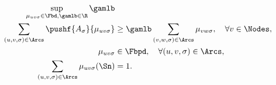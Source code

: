 \begin{myprog}
  \label{prog:dualinf}
  \begin{align}
    \notag
    \sup_{\mu_{uv\sigma} \in \Fbd, \gamlb \in \R} \gamlb\\
    \label{eq:dualinf1}
    \sum_{(u,v,\sigma) \in \Arcs} \pushf{A_{\sigma}}{\mu_{uv\sigma}} & \geq \gamlb \sum_{(v,w,\sigma) \in \Arcs} \mu_{vw\sigma}, \quad \forall v \in \Nodes,\\
    \notag
    \mu_{uv\sigma} & \in \Fbpd, \quad \forall (u, v, \sigma) \in \Arcs,\\
    \label{eq:dualinf3}
    \sum_{(u,v,\sigma) \in \Arcs} \mu_{uv\sigma}(\Sn) & = 1.
  \end{align}
\end{myprog}
